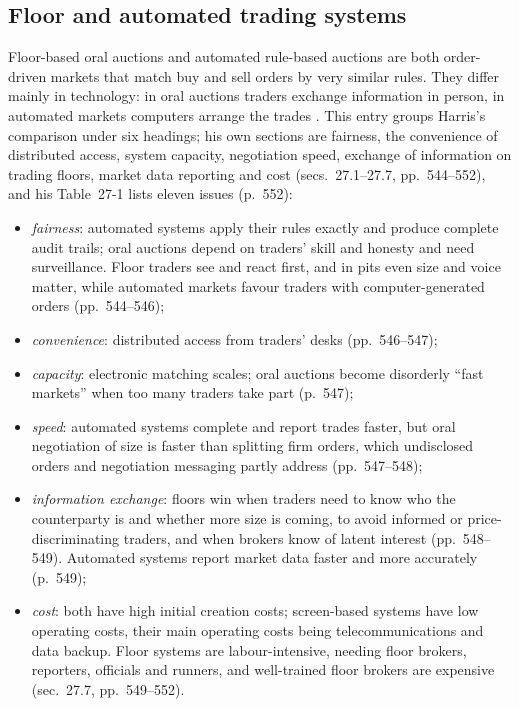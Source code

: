 \subsection{Floor and automated trading systems}

\begin{qfdefinition}\label{def:floor-automated-trading-systems}
 Floor-based oral auctions and automated rule-based auctions are both order-driven markets that match buy and sell orders by very similar rules. They differ mainly in technology: in oral auctions traders exchange information in person, in automated markets computers arrange the trades \citep[chap.~``Floor Versus Automated Trading Systems'', p.~544]{alpha-harris}. This entry groups Harris's comparison under six headings; his own sections are fairness, the convenience of distributed access, system capacity, negotiation speed, exchange of information on trading floors, market data reporting and cost (secs.~27.1--27.7, pp.~544--552), and his Table~27-1 lists eleven issues (p.~552):
\begin{itemize}
\item \emph{fairness}: automated systems apply their rules exactly and produce complete audit trails; oral auctions depend on traders' skill and honesty and need surveillance. Floor traders see and react first, and in pits even size and voice matter, while automated markets favour traders with computer-generated orders (pp.~544--546);
\item \emph{convenience}: distributed access from traders' desks (pp.~546--547);
\item \emph{capacity}: electronic matching scales; oral auctions become disorderly ``fast markets'' when too many traders take part (p.~547);
\item \emph{speed}: automated systems complete and report trades faster, but oral negotiation of size is faster than splitting firm orders, which undisclosed orders and negotiation messaging partly address (pp.~547--548);
\item \emph{information exchange}: floors win when traders need to know who the counterparty is and whether more size is coming, to avoid informed or price-discriminating traders, and when brokers know of latent interest (pp.~548--549). Automated systems report market data faster and more accurately (p.~549);
\item \emph{cost}: both have high initial creation costs; screen-based systems have low operating costs, their main operating costs being telecommunications and data backup. Floor systems are labour-intensive, needing floor brokers, reporters, officials and runners, and well-trained floor brokers are expensive (sec.~27.7, pp.~549--552).
\end{itemize}


\end{qfdefinition}
